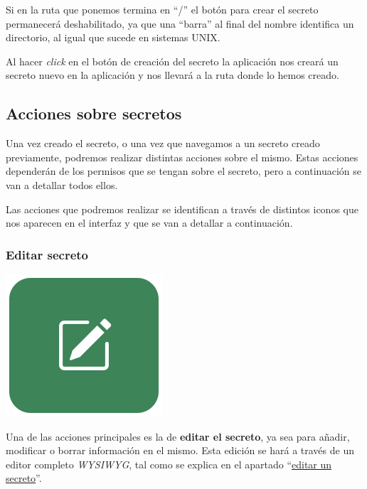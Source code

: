\documentclass{\ClassPath/viu-tfm-template}
\begin{document}
Si en la ruta que ponemos termina en “/” el botón para crear el secreto permanecerá deshabilitado, ya que una “barra” al final del nombre identifica un directorio, al igual que sucede en sistemas UNIX.

Al hacer \textit{click} en el botón de creación del secreto la aplicación nos creará un secreto nuevo en la aplicación y nos llevará a la ruta donde lo hemos creado.

\subsection{Acciones sobre secretos}

Una vez creado el secreto, o una vez que navegamos a un secreto creado previamente, podremos realizar distintas acciones sobre el mismo. Estas acciones dependerán de los permisos que se tengan sobre el secreto, pero a continuación se van a detallar todos ellos.

Las acciones que podremos realizar se identifican a través de  distintos iconos que nos aparecen en el interfaz y que se van a detallar a continuación.


\subsubsection*{Editar secreto}
{
\begin{minipage}{0.1\linewidth}
    \includegraphics[width=\linewidth]{img/edit.png}
\end{minipage}
\hfill
\begin{minipage}{0.85\linewidth}
    Una de las acciones principales es la de \textbf{editar el secreto}, ya sea para añadir, modificar o borrar información en el mismo. Esta edición se hará a través de un editor completo \textit{WYSIWYG}, tal como se explica en el apartado “\hyperlink{editar_secreto}{editar un secreto}”.
\end{minipage}
}
\end{document}
